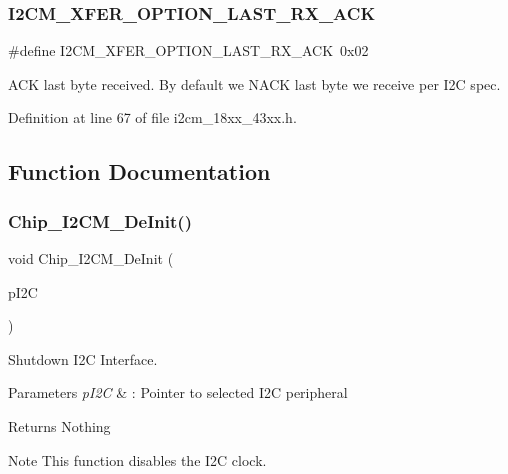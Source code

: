 \subsubsection{\texorpdfstring{I2\+C\+M\+\_\+\+X\+F\+E\+R\+\_\+\+O\+P\+T\+I\+O\+N\+\_\+\+L\+A\+S\+T\+\_\+\+R\+X\+\_\+\+A\+CK}{I2CM\_XFER\_OPTION\_LAST\_RX\_ACK}}
{\footnotesize\ttfamily \#define I2\+C\+M\+\_\+\+X\+F\+E\+R\+\_\+\+O\+P\+T\+I\+O\+N\+\_\+\+L\+A\+S\+T\+\_\+\+R\+X\+\_\+\+A\+CK~0x02}

A\+CK last byte received. By default we N\+A\+CK last byte we receive per I2C spec. 

Definition at line 67 of file i2cm\+\_\+18xx\+\_\+43xx.\+h.



\subsection{Function Documentation}
\mbox{\label{group___i2_c_m__18_x_x__43_x_x_gaf4c9d08157514e8cc0d2bf4a870e85c5}} 
\subsubsection{\texorpdfstring{Chip\+\_\+\+I2\+C\+M\+\_\+\+De\+Init()}{Chip\_I2CM\_DeInit()}}
{\footnotesize\ttfamily void Chip\+\_\+\+I2\+C\+M\+\_\+\+De\+Init (\begin{DoxyParamCaption}\item[{\hyperlink{struct_l_p_c___i2_c___t}{L\+P\+C\+\_\+\+I2\+C\+\_\+T} $\ast$}]{p\+I2C }\end{DoxyParamCaption})}



Shutdown I2C Interface. 


\begin{DoxyParams}{Parameters}
{\em p\+I2C} & \+: Pointer to selected I2C peripheral \\
\hline
\end{DoxyParams}
\begin{DoxyReturn}{Returns}
Nothing 
\end{DoxyReturn}
\begin{DoxyNote}{Note}
This function disables the I2C clock. 
\end{DoxyNote}


